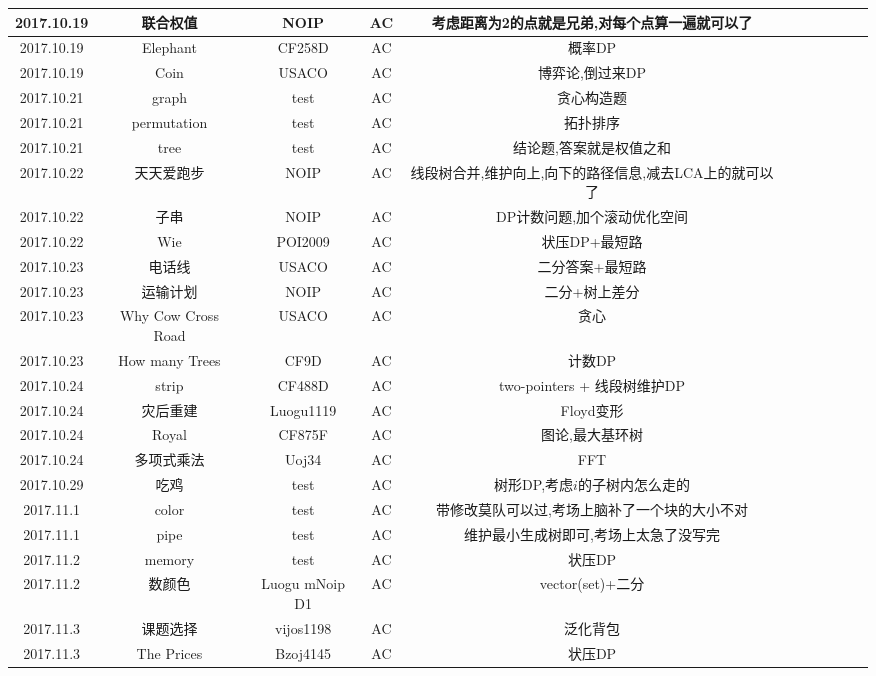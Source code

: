 \documentclass[landscape]{article}
\begin{document}
\begin{longtable}{ccccccccccc}
  \hline
  2017.10.19 & 联合权值 & NOIP & AC & 考虑距离为2的点就是兄弟,对每个点算一遍就可以了\\
  \hline
  2017.10.19 & Elephant & CF258D & AC & 概率DP\\
  \hline
  2017.10.19 & Coin & USACO & AC & 博弈论,倒过来DP\\
  \hline
  2017.10.21 & graph & test & AC & 贪心构造题\\
  \hline
  2017.10.21 & permutation & test & AC & 拓扑排序\\
  \hline
  2017.10.21 & tree & test & AC & 结论题,答案就是权值之和\\
  \hline
  2017.10.22 & 天天爱跑步 & NOIP & AC & 线段树合并,维护向上,向下的路径信息,减去LCA上的就可以了\\
  \hline
  2017.10.22 & 子串 & NOIP & AC & DP计数问题,加个滚动优化空间\\
  \hline
  2017.10.22 & Wie & POI2009 & AC & 状压DP+最短路\\
  \hline
  2017.10.23 & 电话线 & USACO & AC & 二分答案+最短路\\
  \hline
  2017.10.23 & 运输计划 & NOIP & AC & 二分+树上差分\\
  \hline
  2017.10.23 & Why Cow Cross Road & USACO & AC & 贪心\\
  \hline
  2017.10.23 & How many Trees & CF9D & AC & 计数DP\\
  \hline
  2017.10.24 & strip & CF488D & AC & two-pointers + 线段树维护DP\\
  \hline
  2017.10.24 & 灾后重建 & Luogu1119 & AC & Floyd变形\\
  \hline
  2017.10.24 & Royal & CF875F & AC & 图论,最大基环树\\
  \hline
  2017.10.24 & 多项式乘法 & Uoj34 & AC & FFT\\
  \hline
  2017.10.29 & 吃鸡 & test & AC & 树形DP,考虑$i$的子树内怎么走的\\
  \hline
  2017.11.1 & color & test & AC & 带修改莫队可以过,考场上脑补了一个块的大小不对\\
  \hline
  2017.11.1 & pipe & test & AC & 维护最小生成树即可,考场上太急了没写完\\
  \hline
  2017.11.2 & memory & test & AC & 状压DP\\
  \hline
  2017.11.2 & 数颜色 & Luogu mNoip D1 & AC & vector(set)+二分\\
  \hline
  2017.11.3 & 课题选择 & vijos1198 & AC & 泛化背包\\
  \hline
  2017.11.3 & The Prices & Bzoj4145 & AC & 状压DP\\

\end{longtable}
\end{document}
